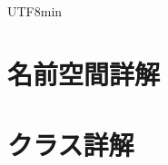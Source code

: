 \documentclass[twoside]{book}
\newcommand{\+}{\discretionary{\mbox{\scriptsize$\hookleftarrow$}}{}{}}
\begin{document}
\begin{CJK}{UTF8}{min}
\chapter{名前空間詳解}

\chapter{クラス詳解}





















\end{CJK}
\end{document}
